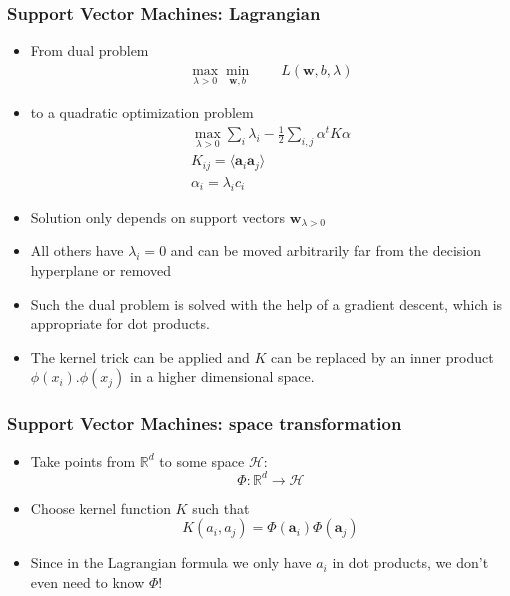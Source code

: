 \documentclass[proffesionalfonts]{beamer}
\begin{document}
\begin{frame}
\frametitle{Support Vector Machines: Lagrangian}
  \begin{itemize}
  \item From dual problem
    \begin{align*}
  \max_{\lambda>0}\min_{\mathbf{w},b}\qquad L(\mathbf{w}, b, \lambda)
    \end{align*}
  \item
to a quadratic optimization problem 
    \begin{align*}
\max_{\lambda>0}\sum_{i} \lambda_{i}-\frac{1}{2} \sum_{i,j} \alpha^{t}K\alpha\\
K_{ij}=\langle\mathbf a_i \mathbf a_j\rangle\\
\alpha_{i}=\lambda_{i}c_{i} 
    \end{align*}
  \item Solution only depends on support vectors $\mathbf{w}_{\lambda>0}$
  \item All others have $\lambda_i=0$ and can be moved arbitrarily far from the decision hyperplane or removed
  \item Such the dual problem is solved with the help of a gradient descent, which is appropriate for dot products. 
  \item The kernel trick can be applied and $K$ can be replaced by an inner product $\phi(x_{i}).\phi(x_{j})$ in a higher dimensional space.
  \end{itemize}
\end{frame}

\begin{frame}
\frametitle{Support Vector Machines: space transformation}
  \begin{itemize}
  \item Take points from $\mathbb R^d$ to some space $\mathcal H$:
\setcounter{equation}{0}
    \begin{equation}
      \Phi : \mathbb R^d \rightarrow \mathcal H
    \end{equation}
  \item Choose kernel function $K$ such that
    \begin{equation}
      K(a_i, a_j) = \Phi(\mathbf a_i) \Phi(\mathbf a_j)
    \end{equation}
  \item Since in the Lagrangian formula we only have $a_i$ in dot products, we don't even need to know $\Phi$!
  \end{itemize}
\end{frame}
\end{document}

